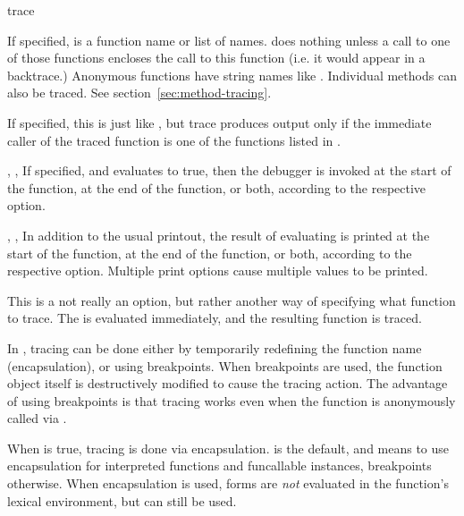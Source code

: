 \begin{defmac}{}{trace}{%
    }
\begin{Lentry}
  \item[\kwd{wherein} \var{names}] If specified,  is a
    function name or list of names.   does nothing unless
    a call to one of those functions encloses the call to this
    function (i.e. it would appear in a backtrace.)  Anonymous
    functions have string names like .  Individual
    methods can also be traced.  See section~\ref{sec:method-tracing}.

  \item[\kwd{wherein-only} \var{names}] If specified, this is just
    like , but trace produces output only if the
    immediate caller of the traced function is one of the functions
    listed in .
    
  \item[\kwd{break} \var{form}, \kwd{break-after} \var{form},
    \kwd{break-all} \var{form}] If specified, and  evaluates
    to true, then the debugger is invoked at the start of the
    function, at the end of the function, or both, according to the
    respective option.
    
  \item[\kwd{print} \var{form}, \kwd{print-after} \var{form},
    \kwd{print-all} \var{form}] In addition to the usual printout, the
    result of evaluating  is printed at the start of the
    function, at the end of the function, or both, according to the
    respective option.  Multiple print options cause multiple values
    to be printed.
    
  \item[\kwd{function} \var{function-form}] This is a not really an
    option, but rather another way of specifying what function to
    trace.  The  is evaluated immediately, and the
    resulting function is traced.
    
  \item[\kwd{encapsulate \mgroup{:default | t | nil}}] In \cmucl,
    tracing can be done either by temporarily redefining the function
    name (encapsulation), or using breakpoints.  When breakpoints are
    used, the function object itself is destructively modified to
    cause the tracing action.  The advantage of using breakpoints is
    that tracing works even when the function is anonymously called
    via .
  
    When  is true, tracing is done via encapsulation.
     is the default, and means to use encapsulation for
    interpreted functions and funcallable instances, breakpoints
    otherwise.  When encapsulation is used, forms are {\it not}
    evaluated in the function's lexical environment, but
     can still be used.


\end{Lentry}
\end{defmac}
